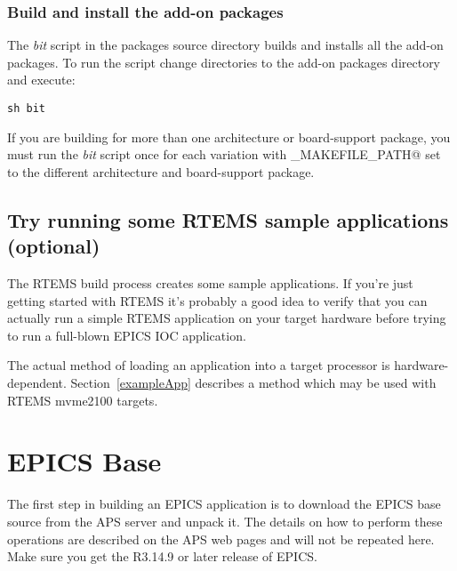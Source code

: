 \documentclass{report}
\begin{document}
\subsection{Build and install the add-on packages}
The {\it bit} script in the packages source directory builds and installs all the add-on packages.  To run
the script change directories to the add-on packages directory and execute:
\begin{verbatim}
sh bit
\end{verbatim}

If you are building for more than one architecture or board-support package, you must run the {\it bit} script once
for each variation with \verb@RTEMS_MAKEFILE_PATH@ set to the different architecture and board-support package.

\section{Try running some RTEMS sample applications (optional)}
The RTEMS build process creates some sample applications.  If you're just getting started with RTEMS it's probably
a good idea to verify that you can actually run a simple RTEMS application on your target hardware before trying to
run a full-blown EPICS IOC application.

The actual method of loading an application into a target processor is
hardware-dependent.  Section~\ref{exampleApp} describes a method which
may be used with RTEMS mvme2100 targets.

\chapter{EPICS Base}
The first step in building an EPICS application is to download the EPICS
base source from the APS server and unpack it.   The details on how
to perform these operations are described on the APS web pages and will
not be repeated here.  Make sure you get the R3.14.9 or later release of EPICS.
\end{document}
